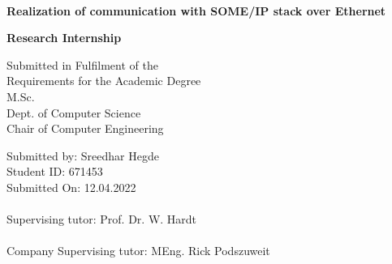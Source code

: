 \documentclass[a4paper, 12pt, oneside, BCOR1cm,toc=chapterentrywithdots]{scrbook}
\begin{document}
%
%

\begin{titlepage}

{
    \begin{center}
        \\
    \end{center}
    \vspace{0.5cm}
}

\begin{center}

\LARGE{\textbf{Realization of communication with SOME/IP stack over Ethernet}}\\
\vspace{1cm}

\Large{\textbf{Research Internship}}\\ 
\vspace{1cm}

Submitted in Fulfilment of the\\
Requirements for the Academic Degree\\
M.Sc.\\

\vspace{0.5cm}
Dept. of Computer Science\\
Chair of Computer Engineering\\

\end{center}
\vspace{0.6cm}
Submitted by: Sreedhar Hegde\\
Student ID: 671453\\
Submitted On: 12.04.2022\\
\vspace{0.5cm}\\
Supervising tutor: Prof. Dr. W. Hardt \\
\vspace{0.5cm}\\
Company Supervising tutor: MEng. Rick Podszuweit

\end{titlepage}
\end{document}

